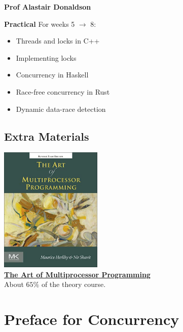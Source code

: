{\begin{center}
\begin{tikzpicture}
        \end{tikzpicture}
        \centerline{\textbf{Prof Alastair Donaldson}}
    \end{center}
    \textbf{Practical} For weeks 5 $\to$ 8:
    \begin{itemize}
        \item Threads and locks in C++
        \item Implementing locks
        \item Concurrency in Haskell
        \item Race-free concurrency in Rust
        \item Dynamic data-race detection
    \end{itemize}
}

\subsection{Extra Materials}
\begin{center}
    \includegraphics[height=6cm]{introduction/images/the_art_of_multicore_programming.jpg}
    \\ \href{https://cs.ipm.ac.ir/asoc2016/Resources/Theartofmulticore.pdf}{\textbf{The Art of Multiprocessor Programming}}
    \\ About $65\%$ of the theory course.
\end{center}


\section{Preface for Concurrency}
